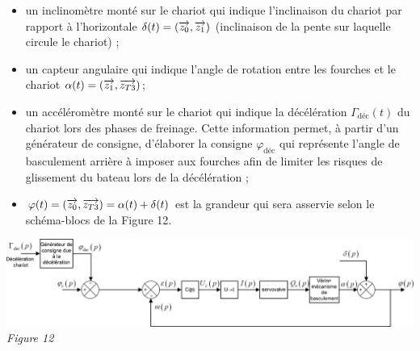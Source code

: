 \documentclass[10pt,fleqn]{article} %
\begin{document}
\begin{itemize}
\item un inclinomètre monté sur le chariot qui indique l’inclinaison du chariot par rapport à l’horizontale $\delta(t) = \left(\overrightarrow{z_0},\overrightarrow{z_1}\right)$ (inclinaison de la pente sur laquelle circule le chariot) ; 
\item un capteur angulaire qui indique l’angle de rotation entre les fourches et le chariot $\alpha(t) = \left(\overrightarrow{z_1},\overrightarrow{z_{T3}}\right)$;
\item un accéléromètre monté sur le chariot qui indique la décélération $\Gamma_{\text{d\'ec}}(t)$ du chariot lors des phases de freinage. Cette information permet, à partir d’un générateur de consigne, d’élaborer la consigne $\varphi_{\text{d\'ec}}$ qui représente l’angle de basculement arrière à imposer aux fourches afin de limiter les risques de glissement du bateau lors de la décélération ;
\item $\varphi(t) = \left(\overrightarrow{z_0},\overrightarrow{z_{T3}}\right)=\alpha(t)+\delta(t)$ est la grandeur qui sera asservie selon le schéma-blocs de la Figure 12.
\end{itemize}
%
%
\begin{center}
\includegraphics[width=1.\linewidth]{images/fig_12}
\textit{Figure 12}
\end{center}
\end{document}
